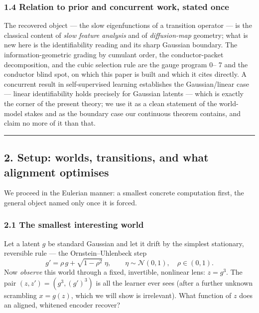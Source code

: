 \documentclass[
  letterpaper,
  11pt]{article}
\providecommand{\hebrewfont}{}
\DeclareRobustCommand{\heb}[1]{%
  \BeginAccSupp{ActualText=L}{\hebrewfont #1}\EndAccSupp{}%
}
\renewcommand{\hebrewfont}{\HebrewSysFont}%
\theoremstyle{plain}
\theoremstyle{definition}
\theoremstyle{remark}
\begin{document}
\subsubsection{1.4 Relation to prior and concurrent work, stated once}\label{relation-to-prior-and-concurrent-work-stated-once}

The recovered object --- the slow eigenfunctions of a transition operator --- is the classical content of \emph{slow feature analysis} and of \emph{diffusion-map} geometry; what is new here is the identifiability reading and its sharp Gaussian boundary. The information-geometric grading by cumulant order, the conductor-packet decomposition, and the cubic selection rule are the gauge program \heb{ל}0--\heb{ל}7 and the conductor blind spot, on which this paper is built and which it cites directly. A concurrent result in self-supervised learning establishes the Gaussian/linear case --- linear identifiability holds precisely for Gaussian latents --- which is exactly the corner of the present theory; we use it as a clean statement of the world-model stakes and as the boundary case our continuous theorem contains, and claim no more of it than that.

\begin{center}\rule{0.5\linewidth}{0.5pt}\end{center}

\subsection{2. Setup: worlds, transitions, and what alignment optimises}\label{sec:setup}

We proceed in the Eulerian manner: a smallest concrete computation first, the general object named only once it is forced.

\subsubsection{2.1 The smallest interesting world}\label{the-smallest-interesting-world}

Let a latent \(g\) be standard Gaussian and let it drift by the simplest stationary, reversible rule --- the Ornstein--Uhlenbeck step
\[g' = \rho\, g + \sqrt{1-\rho^2}\;\eta, \qquad \eta\sim\mathcal N(0,1),\quad \rho\in(0,1).\]
Now \emph{observe} this world through a fixed, invertible, nonlinear lens: \(z = g^3\). The pair \((z,z')=(g^3,(g')^3)\) is all the learner ever sees (after a further unknown scrambling \(x=g(z)\), which we will show is irrelevant). What function of \(z\) does an aligned, whitened encoder recover?
\end{document}
